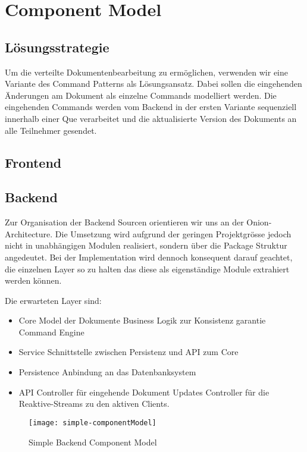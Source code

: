 \section{Component Model}

\subsection{Lösungsstrategie}
Um die verteilte Dokumentenbearbeitung zu ermöglichen, verwenden wir eine Variante des Command Patterns als Lösungsansatz.
Dabei sollen die eingehenden Änderungen am Dokument als einzelne Commands modelliert werden.
Die eingehenden Commands werden vom Backend in der ersten Variante sequenziell innerhalb einer Que verarbeitet und die aktualisierte Version des Dokuments an alle Teilnehmer gesendet.

\subsection{Frontend}

\subsection{Backend}
Zur Organisation der Backend Sourcen orientieren wir uns an der Onion-Architecture.
Die Umsetzung wird aufgrund der geringen Projektgrösse jedoch nicht in unabhängigen Modulen realisiert, sondern über die Package Struktur angedeutet.
Bei der Implementation wird dennoch konsequent darauf geachtet, die einzelnen Layer so zu halten das diese als eigenständige Module extrahiert werden können.

Die erwarteten Layer sind:
\begin{itemize}
    \item Core
    \subitem Model der Dokumente
    \subitem Business Logik zur Konsistenz garantie
    \subitem Command Engine
    \item Service
    \subitem Schnittstelle zwischen Persistenz und API zum Core
    \item Persistence
    \subitem Anbindung an das Datenbanksystem
    \item API
    \subitem Controller für eingehende Dokument Updates
    \subitem Controller für die Reaktive-Streams zu den aktiven Clients.
\end{itemize}

\begin{figure}[hbt!]
    \texttt{[image: simple-componentModel]}
    \caption{Simple Backend Component Model}
\end{figure}
